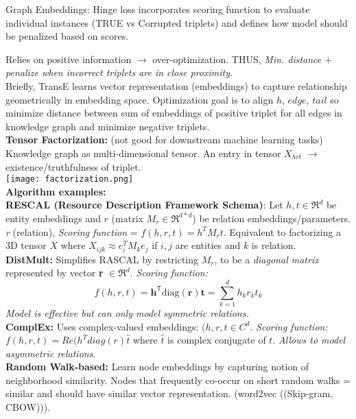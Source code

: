 \documentclass[twocolumn]{article}
\begin{document}
\begin{literaturepaper}{Graph Embeddings:}
Hinge loss incorporates scoring function to evaluate individual instances (TRUE vs Corrupted triplets) and defines how model should be penalized based on scores.

Relies on positive information $\rightarrow$ over-optimization. THUS, \textit{Min. distance $+$ penalize when incorrect triplets are in close proximity.}\\

Briefly, TransE learns vector representation (embeddings) to capture relationship geometrically in embedding space. Optimization goal is to align $h$, $edge$, $tail$ so minimize distance between sum of embeddings of positive triplet for all edges in knowledge graph and minimize negative triplets. \\

\textbf{Tensor Factorization:} (not good for downstream machine learning tasks) Knowledge graph as multi-dimensional tensor. An entry in tensor $X_{hrt}$ $\rightarrow$ existence/truthfulness of triplet. \\

\texttt{[image: factorization.png]}\\

\textbf{Algorithm examples:}\\

\textbf{RESCAL (Resource Description Framework Schema)}:
Let $h, t \in \Re^d$ be entity embeddings and $r$ (matrix \textbf{$M_r \in \Re^{d * d}$}) be relation embeddings/parameters.
\textit{r} (relation), \textit{Scoring function} = $f(h,r,t) = h^TM_rt$. Equivalent to factorizing a 3D tensor $X$ where $X_{ijk} \approx e^T_iM_ke_j$ if $i,j$ are entities and $k$ is relation.\\

\textbf{DistMult:} Simplifies RASCAL by restricting $M_r$, to be a \textit{diagonal matrix} represented by vector \textbf{r} $\in \Re^d$. \textit{Scoring function:} $$
f(h,r,t) = \mathbf{h}^{\mathsf{T}} \text{diag}(\mathbf{r}) \mathbf{t} = \sum_{k=1}^{d} h_k r_k t_k
$$
\textit{Model is effective but can only model symmetric relations.}\\

\textbf{ComplEx:} Uses complex-valued embeddings: $(h,r,t \in C^d$. \textit{Scoring function:} $f(h,r,t) = Re(h^T diag(r)\hat{t}$ where $\hat{t}$ is complex conjugate of $t$. \textit{Allows to model asymmetric relations}.\\

\textbf{Random Walk-based:} Learn node embeddings by capturing notion of neighborhood similarity. Nodes that frequently co-occur on short random walks = similar and should have similar vector representation. (word2vec ((Skip-gram, CBOW))).


\end{literaturepaper}
\end{document}

